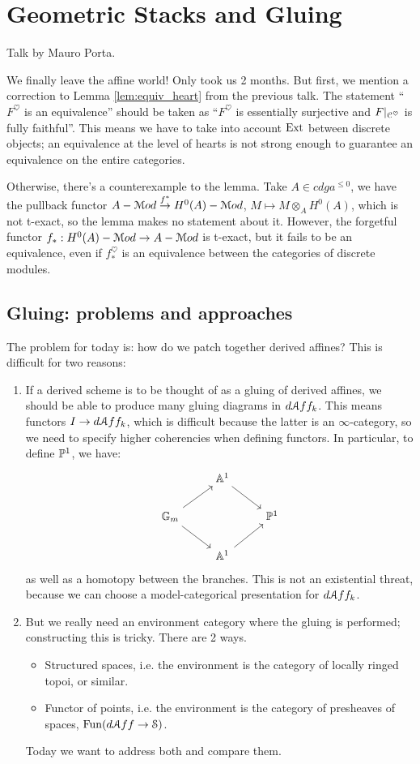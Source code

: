 \chapter{Geometric Stacks and Gluing}
Talk by Mauro Porta.


We finally leave the affine world! Only took us 2 months. But first, we mention a
correction to Lemma \ref{lem:equiv_heart} from the previous talk.
The statement ``$F^{\heartsuit}$ is an equivalence'' should be taken as ``$F^{\heartsuit}$ is essentially surjective and 
$F|_{\mathcal C^{\heartsuit}}$ is
fully faithful''. This means we have to take into account $\operatorname{Ext}$ between discrete objects; an equivalence at the level of
hearts is not strong enough to guarantee an equivalence on the entire categories.

Otherwise, there's a counterexample to the lemma. Take $A \in cdga^{\leq 0}$, we have the pullback  functor 
$A-\mathcal M od \overset{f^*}{\to} H^0(A)-\mathcal M od$, $M\mapsto M \otimes_A H^0(A)$, which is not t-exact, so the lemma makes no statement
about it. However, the forgetful functor $f_* : H^0(A) - \mathcal M od \to A-\mathcal M od$ is t-exact, but it fails to be an equivalence, even if
$f_*^{\heartsuit}$ is an equivalence between the categories of discrete modules.


\section{Gluing: problems and approaches}
The problem for today is: how do we patch together derived affines? This is difficult for two reasons:
\begin{enumerate}
\item If a derived scheme is to be thought of as a gluing of derived affines, we should be able to produce many gluing
diagrams in $d \mathcal A ff_k$. This means functors $I \to d \mathcal A ff_k$, which is difficult because the latter is an $\infty$-category,
so we need to specify higher coherencies when defining functors.
In particular, to define $\mathbb P^1$, we have:
\[
\begin{tikzcd}
\; & \bbA^1\arrow{dr} &  \\
\bbG_m \arrow{ur}\arrow{dr} & & \bbP^1 \\
& \bbA^1\arrow{ur} &
\end{tikzcd}
\] 
as well as a homotopy between the branches. 
This is not an existential threat, because we can choose a model-categorical presentation for $d \mathcal A ff_k$.
\item But we really need an environment category where the gluing is performed; constructing this is tricky. There are 2 ways.
\begin{itemize}
\item Structured spaces, i.e. the environment is the category of locally ringed topoi, or similar.
\item Functor of points, i.e. the environment is the category of presheaves of spaces, $\operatorname{Fun}(d\mathcal A ff \to \mathcal S)$.
\end{itemize}
Today we want to address both and compare them.
\end{enumerate}


